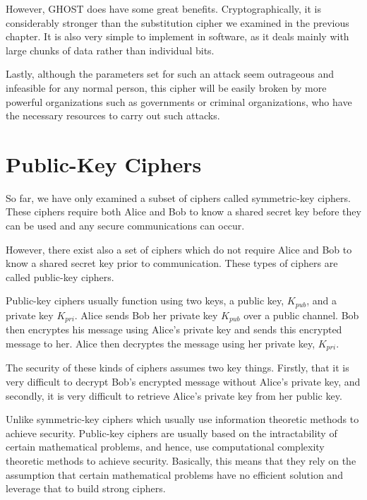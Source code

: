 \documentclass[12pt, a4paper, final]{report}
\begin{document}
However, GHOST does have some great benefits. Cryptographically, it is
considerably stronger than the substitution cipher we examined in the previous
chapter. It is also very simple to implement in software, as it deals mainly with
large chunks of data rather than individual bits.

Lastly, although the parameters set for such an attack seem outrageous and
infeasible for any normal person, this cipher will be easily broken by more
powerful organizations such as governments or criminal organizations, who have
the necessary resources to carry out such attacks.


\section{Public-Key Ciphers}

So far, we have only examined a subset of ciphers called symmetric-key
ciphers. These ciphers require both Alice and Bob to know a shared secret key
before they can be used and any secure communications can occur.

However, there exist also a set of ciphers which do not require Alice and Bob
to know a shared secret key prior to communication. These types of ciphers
are called public-key ciphers.

Public-key ciphers usually function using two keys, a public key, $K_{pub}$,
and a private key $K_{pri}$. Alice sends Bob her private key $K_{pub}$ over
a public channel. Bob then encryptes his message using Alice's private key
and sends this encrypted message to her. Alice then decryptes the message
using her private key, $K_{pri}$.

The security of these kinds of ciphers assumes two key things. Firstly, that
it is very difficult to decrypt Bob's encrypted message without Alice's
private key, and secondly, it is very difficult to retrieve Alice's private
key from her public key.

Unlike symmetric-key ciphers which usually use information theoretic methods
to achieve security. Public-key ciphers are usually based on the intractability
of certain mathematical problems, and hence, use computational complexity
theoretic methods to achieve security. Basically, this means that they rely on
the assumption that certain mathematical problems have no efficient solution
and leverage that to build strong ciphers.
\end{document}
